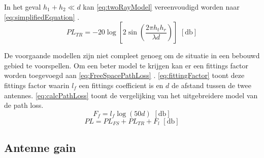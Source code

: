 In het geval $h_1+h_2\ll d$ kan \autoref{eq:twoRayModel} vereenvoudigd worden naar \autoref{eq:simplifiedEquation} \cite{brini2019system}.
\begin{equation}\label{eq:simplifiedEquation}
    PL_{TR}=-20\log\left[2\sin\left(\frac{2\pi h_th_r}{\lambda d}\right)\right] \,\,\left[\unit{\decibel}\right]
\end{equation}

De voorgaande modellen zijn niet compleet genoeg om de situatie in een bebouwd gebied te voorspellen. Om een beter model te krijgen kan er een fittings factor worden toegevoegd aan \autoref{eq:FreeSpacePathLoss} \cite[24]{brini2019system}. \autoref{eq:fittingFactor} toont deze fittings factor waarin \(l_f\) een fittings coefficient is en $d$ de afstand tussen de twee antennes. \autoref{eq:calcPathLoss} toont de vergelijking van het uitgebreidere model van de path loss.
\begin{equation} \label{eq:fittingFactor}
    F_f=l_f\log(50d) \,\,\left[\unit{\decibel}\right]
\end{equation}
\begin{equation}\label{eq:calcPathLoss}
    PL= PL_{FS}+PL_{TR}+F_l \,\,\left[\unit{\decibel}\right]
\end{equation}


\subsection{Antenne gain}